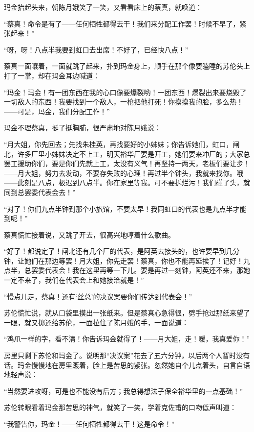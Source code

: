 \par 玛金抬起头来，朝陈月娥笑了一笑，又看看床上的蔡真，就唤道：
\par “蔡真！命令是有了——任何牺牲都得去干！我们来分配工作罢！时候不早了，紧张起来！”
\par “呀，呀！八点半我要到虹口去出席！不好了，已经快八点！”
\par 蔡真一面嚷着，一面就跳了起来，扑到玛金身上，顺手在那个像要瞌睡的苏伦头上打了一掌，却在玛金耳边喊道：
\par “玛金！玛金！有一团东西在我的心口像要爆裂哟！一团东西！爆裂出来要烧毁了一切敌人的东西！我要找到一个敌人，一枪把他打死！你摸摸我的脸，多么热！——可是，玛金，我们分配工作！”
\par 玛金不理蔡真，挺了挺胸脯，很严肃地对陈月娥说：
\par “月大姐，你先回去；先找朱桂英，再找要好的小姊妹；你告诉她们，虹口，闸北，许多厂里小姊妹决定不上工，明天裕华厂要是开工，她们要来冲厂的；大家总罢工援助你们，要是你们先就上工，太没有义气！再坚持一两天，老板们要让步！——月大姐，努力去发动，不要存失败的心理！再过半个钟头，我就来找你。哦——此刻是八点，极迟到八点半。你在家里等我。可不要拆烂污！我们碰了头，就同到总罢委代表会去！”
\par “对了！你们九点半钟到那个小旅馆，不要太早！我同虹口的代表也是九点半才能到呢！”
\par 蔡真慌忙接着说，又跳了开去，很高兴地哼着什么歌曲。
\par “好了！都说定了！闸北还有几个厂的代表，是阿英去接头的，也许要早到几分钟，让她们在那边等罢！月大姐，你先走罢！蔡真，你也不能再延挨了！记好！九点半，总罢委代表会！我在这里再等一下儿。要是再过一刻钟，阿英还不来，那她一定不来了，我们在代表会上和她接洽就是！”
\par “慢点儿走，蔡真！还有‘丝总’的决议案要你们传达到代表会！”
\par 苏伦慌忙说，就从口袋里摸出一张纸来。但是蔡真心急得很，劈手抢过那纸来望了一眼，就又掷还给苏伦，一面拉住了陈月娥的手，一面说道：
\par “鸡爪一样的字，看不清！你告诉玛金就得了！——月大姐，走！嗳，我真爱你！”
\par 房里只剩下苏伦和玛金了。说明那“决议案”花去了五六分钟，以后两个人暂时没有话。玛金慢慢地在房里踱着，脸上是苦思的紧张。忽然她自个儿点着头，自言自语地轻声说：
\par “当然要进攻呀，可是也不能没有后方；我总得想法子保全裕华里的一点基础！”
\par 苏伦转眼看着玛金那苦思的神气，就笑了一笑，学着克佐甫的口吻低声叫道：
\par “我警告你，玛金！——任何牺牲都得去干！这是命令！”
